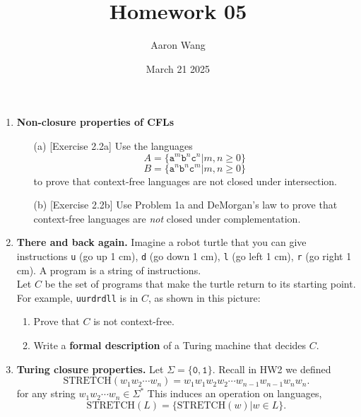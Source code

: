 \documentclass{article}
\title{Homework 05}
\author{Aaron Wang}
\date{March 21 2025}
\newcommand{\s}{\Sigma}
\newcommand{\str}{\texttt}
\newcommand{\newp}{\\[2mm]}
\begin{document}
\maketitle
\begin{enumerate}
    \item \textbf{Non-closure properties of CFLs}
    \begin{enumerate}
        \item [(a)][Exercise 2.2a] Use the languages
        \[
            A=\{\str{a}^m\str{b}^n\str{c}^n|m,n \geq 0\}
        \]
        \[
            B=\{\str{a}^n\str{b}^n\str{c}^m|m,n \geq 0\}
        \]
        to prove that context-free languages are not closed under intersection. \newp
        
        \item [(b)][Exercise 2.2b] Use Problem 1a and DeMorgan’s law to prove that context-free languages are \textit{not} closed under complementation. \newp
        
    \end{enumerate}
\newpage
    \item \textbf{There and back again.} Imagine a robot turtle that you can give instructions \str{u} (go up 1 cm), \str{d} (go down 1 cm), \str{l} (go left 1 cm), \str{r} (go right 1 cm). A program is a string of instructions.\newp
    Let $C$ be the set of programs that make the turtle return to its starting point. For example, \str{uurdrdll} is in $C$, as shown in this picture:
    
    \vspace{-10mm}
    \begin{enumerate}
        \item Prove that $C$ is not context-free.\newp
        
        \item Write a \textbf{formal description} of a Turing machine that decides $C$.\newp
        
    \end{enumerate}
\newpage
    \item \textbf{Turing closure properties.} Let $\s = \{\str{0}, \str{1}\}$. Recall in HW2 we defined
        \[
        \text{STRETCH}(w_1w_2 \cdots w_n) = w_1w_1w_2w_2 \cdots w_{n-1}w_{n-1}w_nw_n. 
        \]
        for any string $w_1w_2 \cdots w_n \in \s^*$ This induces an operation on languages,
        \[
        \text{STRETCH}(L) = \{\text{STRETCH}(w) | w \in L\}.  
        \]


\end{enumerate}
\end{document}
